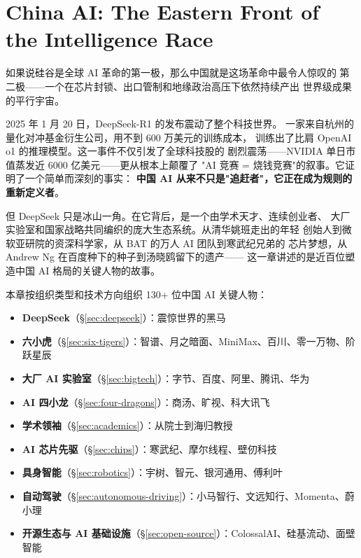 
\chapter{China AI: The Eastern Front of the Intelligence Race}
\label{ch:china}


如果说硅谷是全球 AI 革命的第一极，那么中国就是这场革命中最令人惊叹的
第二极——一个在芯片封锁、出口管制和地缘政治高压下依然持续产出
世界级成果的平行宇宙。

2025 年 1 月 20 日，DeepSeek-R1 的发布震动了整个科技世界。
一家来自杭州的量化对冲基金衍生公司，用不到 600 万美元的训练成本，
训练出了比肩 OpenAI o1 的推理模型。这一事件不仅引发了全球科技股的
剧烈震荡——NVIDIA 单日市值蒸发近 6000 亿美元——更从根本上颠覆了
"AI 竞赛 = 烧钱竞赛"的叙事。它证明了一个简单而深刻的事实：
\textbf{中国 AI 从来不只是"追赶者"，它正在成为规则的重新定义者}。

但 DeepSeek 只是冰山一角。在它背后，是一个由学术天才、连续创业者、
大厂实验室和国家战略共同编织的庞大生态系统。从清华姚班走出的年轻
创始人到微软亚研院的资深科学家，从 BAT 的万人 AI 团队到寒武纪兄弟的
芯片梦想，从 Andrew Ng 在百度种下的种子到汤晓鸥留下的遗产——
这一章讲述的是近百位塑造中国 AI 格局的关键人物的故事。

\begin{corebox}[本章结构]
本章按组织类型和技术方向组织 130+ 位中国 AI 关键人物：
\begin{itemize}[noitemsep]
  \item \textbf{DeepSeek}（§\ref{sec:deepseek}）：震惊世界的黑马
  \item \textbf{六小虎}（§\ref{sec:six-tigers}）：智谱、月之暗面、MiniMax、百川、零一万物、阶跃星辰
  \item \textbf{大厂 AI 实验室}（§\ref{sec:bigtech}）：字节、百度、阿里、腾讯、华为
  \item \textbf{AI 四小龙}（§\ref{sec:four-dragons}）：商汤、旷视、科大讯飞
  \item \textbf{学术领袖}（§\ref{sec:academics}）：从院士到海归教授
  \item \textbf{AI 芯片先驱}（§\ref{sec:chips}）：寒武纪、摩尔线程、壁仞科技
  \item \textbf{具身智能}（§\ref{sec:robotics}）：宇树、智元、银河通用、傅利叶
  \item \textbf{自动驾驶}（§\ref{sec:autonomous-driving}）：小马智行、文远知行、Momenta、蔚小理
  \item \textbf{开源生态与 AI 基础设施}（§\ref{sec:open-source}）：ColossalAI、硅基流动、面壁智能
\end{itemize}
\end{corebox}


